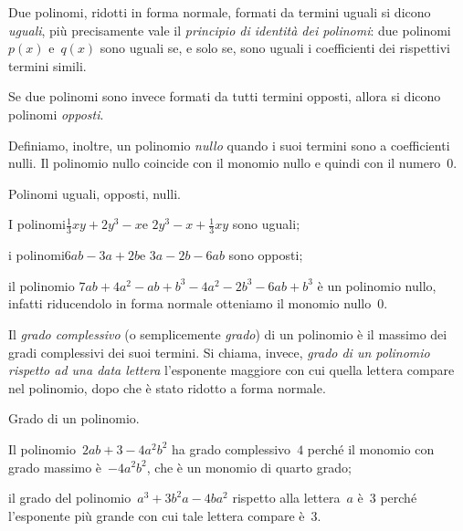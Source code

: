 \begin{definizione}
Due polinomi, ridotti in forma normale, formati da termini uguali si dicono \emph{uguali}, più precisamente vale il \emph{principio di identità dei polinomi}:
due polinomi~$p(x)$ e~$q(x)$ sono uguali se, e solo se, sono uguali
i coefficienti dei rispettivi termini simili.

Se due polinomi sono invece formati da tutti termini opposti, allora si dicono polinomi \emph{opposti}.

Definiamo, inoltre, un polinomio \emph{nullo} quando i suoi termini sono a coefficienti nulli. Il polinomio nullo
coincide con il monomio nullo e quindi con il numero~0.
\end{definizione}
\pagebreak
\begin{exrig}
\begin{esempio}
Polinomi uguali, opposti, nulli.
\begin{enumeratea}
\item I polinomi\quad $\frac{1}{3}xy+2y^3−x$\quad e \quad$2y^3-x+\frac{1}{3}xy$ \quad sono uguali;
\item i polinomi\quad $6ab−3a+2b$\quad e \quad$3a−2b−6ab$ \quad sono opposti;
\item il polinomio \quad $7ab+4a^2−ab+b^3−4a^2−2b^3−6ab+b^3$ \quad è un polinomio nullo, infatti riducendolo in forma normale otteniamo il monomio nullo~$0$.
\end{enumeratea}
\end{esempio}
\end{exrig}

\begin{definizione}
Il \emph{grado complessivo} (o semplicemente \emph{grado}) di un polinomio è il massimo dei gradi complessivi dei suoi
termini. Si chiama, invece, \emph{grado di un polinomio rispetto ad una data lettera} l'esponente maggiore con
cui quella lettera compare nel polinomio, dopo che è stato ridotto a forma normale.
\end{definizione}

\begin{exrig}
\begin{esempio} Grado di un polinomio.
\begin{itemize*}
\item Il polinomio~$2ab+3−4a^2b^2$ ha grado complessivo~$4$ perché il monomio con grado massimo è~$−4a^2b^2 $, che è un monomio di quarto grado;
\item il grado del polinomio~$a^3+3b^2a−4ba^2$ rispetto alla lettera~$a$ è~$3$ perché l'esponente più grande con cui tale lettera compare è~$3$.
\end{itemize*}
\end{esempio}
\end{exrig}

